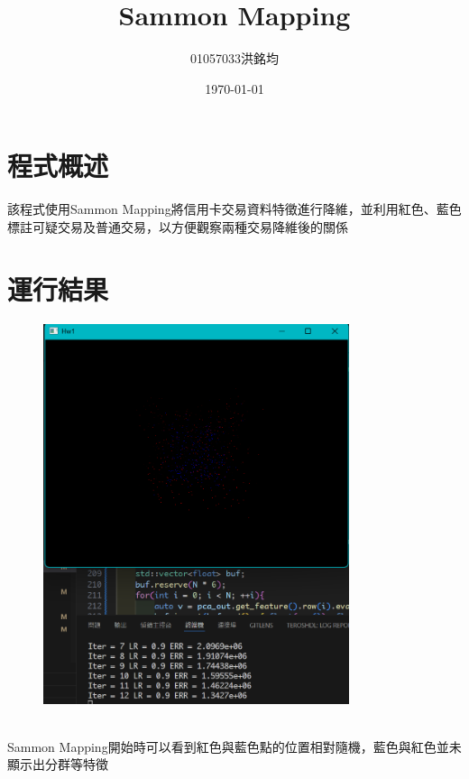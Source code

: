 \documentclass[a4paper,12pt]{article}
\title{Sammon Mapping}
\author{01057033洪銘均}
\date{\today}
\begin{document}
\maketitle
\tableofcontents
\newpage

\section{程式概述}
該程式使用Sammon Mapping將信用卡交易資料特徵進行降維，並利用紅色、藍色標註可疑交易及普通交易，以方便觀察兩種交易降維後的關係


\section{運行結果}

\begin{figure}[H]
    \centering
    \includegraphics[width=0.8\textwidth]{img/img2.png}
\end{figure}\\
Sammon Mapping開始時可以看到紅色與藍色點的位置相對隨機，藍色與紅色並未顯示出分群等特徵
\end{document}

